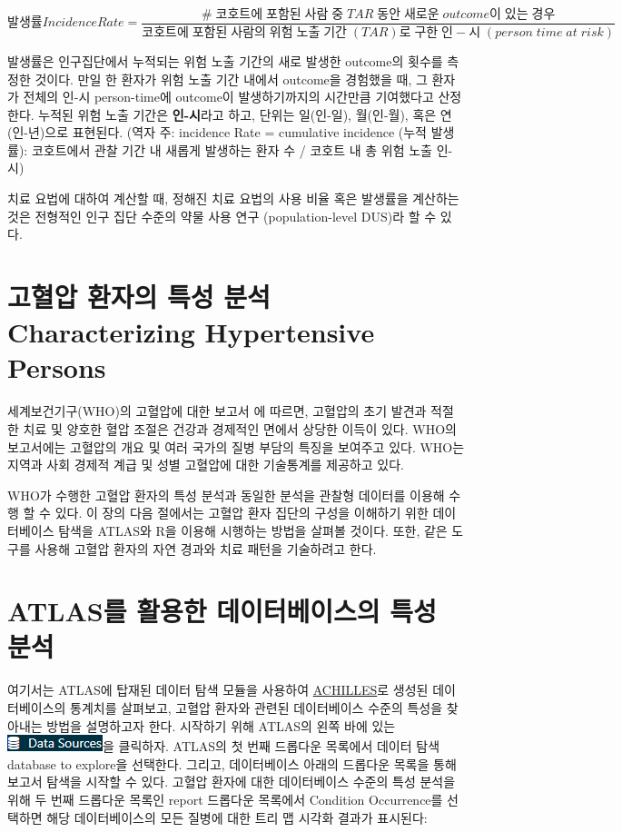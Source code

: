 \documentclass[10.5pt]{book}
\theoremstyle{definition}
\theoremstyle{definition}
\theoremstyle{definition}
\theoremstyle{remark}
\begin{document}
\[
발생률 Incidence Rate= \frac{\#\;코호트에\;포함된\;사람\;중\;TAR\;동안\;새로운\;outcome이\;있는\;경우}{코호트에\;포함된\;사람의\;위험\;노출\;기간\;(TAR)로\;구한\;인-시\;(person\;time\;at\;risk)}
\]

발생률은 인구집단에서 누적되는 위험 노출 기간의 새로 발생한 outcome의
횟수를 측정한 것이다. 만일 한 환자가 위험 노출 기간 내에서 outcome을
경험했을 때, 그 환자가 전체의 인-시 person-time에 outcome이
발생하기까지의 시간만큼 기여했다고 산정한다. 누적된 위험 노출 기간은
\textbf{인-시}라고 하고, 단위는 일(인-일), 월(인-월), 혹은 연(인-년)으로
표현된다.   (역자 주: incidence
Rate = cumulative incidence (누적 발생률): 코호트에서 관찰 기간 내
새롭게 발생하는 환자 수 / 코호트 내 총 위험 노출 인-시)

치료 요법에 대하여 계산할 때, 정해진 치료 요법의 사용 비율 혹은 발생률을
계산하는 것은 전형적인 인구 집단 수준의 약물 사용 연구 (population-level
DUS)라 할 수 있다.

\section{고혈압 환자의 특성 분석 Characterizing Hypertensive
Persons}\label{----characterizing-hypertensive-persons}

세계보건기구(WHO)의 고혈압에 대한 보고서 \citep{WHOHypertension} 에
따르면, 고혈압의 초기 발견과 적절한 치료 및 양호한 혈압 조절은 건강과
경제적인 면에서 상당한 이득이 있다. WHO의 보고서에는 고혈압의 개요 및
여러 국가의 질병 부담의 특징을 보여주고 있다. WHO는 지역과 사회 경제적
계급 및 성별 고혈압에 대한 기술통계를 제공하고 있다.

WHO가 수행한 고혈압 환자의 특성 분석과 동일한 분석을 관찰형 데이터를
이용해 수행 할 수 있다. 이 장의 다음 절에서는 고혈압 환자 집단의 구성을
이해하기 위한 데이터베이스 탐색을 ATLAS와 R을 이용해 시행하는 방법을
살펴볼 것이다. 또한, 같은 도구를 사용해 고혈압 환자의 자연 경과와 치료
패턴을 기술하려고 한다.

\section{ATLAS를 활용한 데이터베이스의 특성 분석}\label{atlas----}

여기서는 ATLAS에 탑재된 데이터 탐색 모듈을 사용하여
\href{https://github.com/OHDSI/Achilles}{ACHILLES}로 생성된
데이터베이스의 통계치를 살펴보고, 고혈압 환자와 관련된 데이터베이스
수준의 특성을 찾아내는 방법을 설명하고자 한다. 시작하기 위해 ATLAS의
왼쪽 바에 있는
\includegraphics{images/Characterization/atlasDataSourcesMenuItem.png}을
클릭하자. ATLAS의 첫 번째 드롭다운 목록에서 데이터 탐색 database to
explore을 선택한다. 그리고, 데이터베이스 아래의 드롭다운 목록을 통해
보고서 탐색을 시작할 수 있다. 고혈압 환자에 대한 데이터베이스 수준의
특성 분석을 위해 두 번째 드롭다운 목록인 report 드롭다운 목록에서
Condition Occurrence를 선택하면 해당 데이터베이스의 모든 질병에 대한
트리 맵 시각화 결과가 표시된다:
\end{document}
